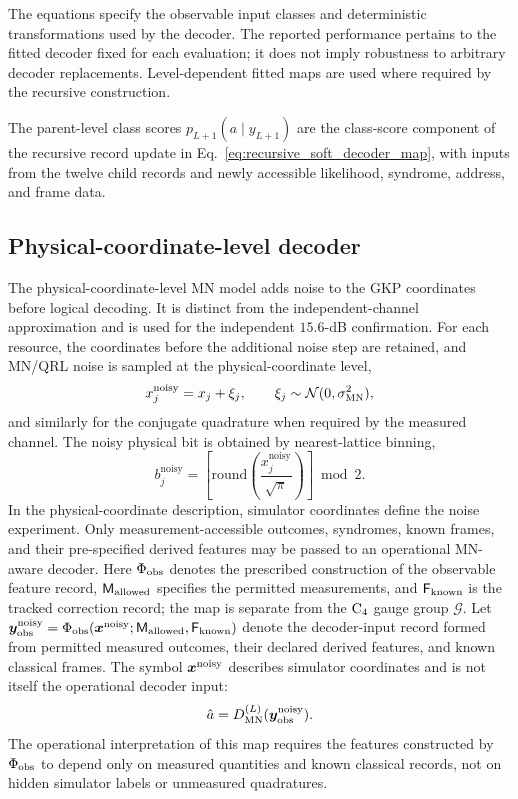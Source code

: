 \documentclass[aps,
prx,
superscriptaddress,
reprint,
longbibliography,
floatfix]{revtex4-2}
\newcommand{\MN}{\mathrm{MN}}
\newcommand{\act}{a}
\begin{document}
The equations specify the observable input classes and deterministic transformations used by the decoder. The reported performance pertains to the fitted decoder fixed for each evaluation; it does not imply robustness to arbitrary decoder replacements. Level-dependent fitted maps are used where required by the recursive construction.

The parent-level class scores $p_{L+1}(a\mid y_{L+1})$ are the class-score component of the recursive record update in Eq.~\eqref{eq:recursive_soft_decoder_map}, with inputs from the twelve child records and newly accessible likelihood, syndrome, address, and frame data.


\subsection{Physical-coordinate-level decoder}

The physical-coordinate-level MN model adds noise to the GKP coordinates before logical decoding. It is distinct from the independent-channel approximation and is used for the independent $15.6$-dB confirmation. For each resource, the coordinates before the additional noise step are retained, and MN/QRL noise is sampled at the physical-coordinate level,
\begin{equation}
 x_j^{\mathrm{noisy}}
 =
 x_j+\xi_j,
 \qquad
 \xi_j\sim{\cal N}(0,\sigma_{\MN}^2),
\end{equation}
and similarly for the conjugate quadrature when required by the measured channel. The noisy physical bit is obtained by nearest-lattice binning,
\begin{equation}
 b_j^{\mathrm{noisy}}
 =
 \left[
 \mathrm{round}\!\left(\frac{x_j^{\mathrm{noisy}}}{\sqrt{\pi}}\right)
 \right]\bmod 2 .
\end{equation}
In the physical-coordinate description, simulator coordinates define the noise experiment. Only measurement-accessible outcomes, syndromes, known frames, and their pre-specified derived features may be passed to an operational MN-aware decoder. Here $\Phi_{\rm obs}$ denotes the prescribed construction of the observable feature record, $\mathsf M_{\rm allowed}$ specifies the permitted measurements, and $\mathsf F_{\rm known}$ is the tracked correction record; the map is separate from the ${\rm C_4}$ gauge group $\mathcal G$. Let $\bm y_{\rm obs}^{\rm noisy}=\Phi_{\rm obs}(\bm x^{\rm noisy};\mathsf M_{\rm allowed},\mathsf F_{\rm known})$ denote the decoder-input record formed from permitted measured outcomes, their declared derived features, and known classical frames. The symbol $\bm x^{\rm noisy}$ describes simulator coordinates and is not itself the operational decoder input:
\begin{equation}
\hat{\act}=D_{\MN}^{(L)}(\bm y_{\rm obs}^{\rm noisy}).
\end{equation}
The operational interpretation of this map requires the features constructed by $\Phi_{\rm obs}$ to depend only on measured quantities and known classical records, not on hidden simulator labels or unmeasured quadratures.
\end{document}
